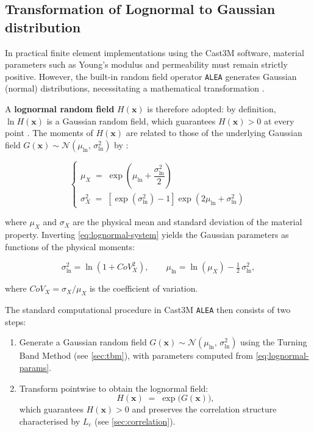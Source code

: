 \subsection{Transformation of Lognormal to Gaussian distribution} \label{sec:lognormal-transformation}

In practical finite element implementations using the Cast3M software, material parameters such as Young's modulus and permeability must remain strictly positive. However, the built-in random field operator \texttt{ALEA} generates Gaussian (normal) distributions, necessitating a mathematical transformation \cite{sudret2000}.

A \textbf{lognormal random field} $H(\mathbf{x})$ is therefore adopted: by definition, $\ln H(\mathbf{x})$ is a Gaussian random field, which guarantees $H(\mathbf{x}) > 0$ at every point \cite{delarrard2010}. The moments of $H(\mathbf{x})$ are related to those of the underlying Gaussian field $G(\mathbf{x}) \sim \mathcal{N}(\mu_{\ln},\,\sigma_{\ln}^2)$ by \cite{sudret2000}:

\begin{equation}
    \begin{cases}
        \mu_X \;=\; \exp\!\left(\mu_{\ln} + \dfrac{\sigma_{\ln}^2}{2}\right) \\[8pt]
        \sigma_X^2 \;=\; \left[\exp(\sigma_{\ln}^2) - 1\right]
                         \exp\!\left(2\mu_{\ln} + \sigma_{\ln}^2\right)
    \end{cases}
    \label{eq:lognormal-system}
\end{equation}

where $\mu_X$ and $\sigma_X$ are the physical mean and standard deviation of the material property. Inverting \cref{eq:lognormal-system} yields the Gaussian parameters as functions of the physical moments:

\begin{equation}
    \sigma_{\ln}^2 = \ln\!\left(1 + CoV_X^2\right),
    \qquad
    \mu_{\ln} = \ln(\mu_X) - \tfrac{1}{2}\,\sigma_{\ln}^2,
    \label{eq:lognormal-params}
\end{equation}

where $CoV_X = \sigma_X/\mu_X$ is the coefficient of variation.

The standard computational procedure in Cast3M \texttt{ALEA} then consists of two steps:

\begin{enumerate}
    \item Generate a Gaussian random field
          $G(\mathbf{x}) \sim \mathcal{N}(\mu_{\ln},\,\sigma_{\ln}^2)$ using the Turning Band Method (see \cref{sec:tbm}), with parameters computed from \cref{eq:lognormal-params}.

    \item Transform pointwise to obtain the lognormal field:
          \begin{equation}
              H(\mathbf{x}) \;=\;
              \exp\!\bigl(G(\mathbf{x})\bigr),
              \label{eq:lognormal-transform}
          \end{equation}
          which guarantees $H(\mathbf{x}) > 0$ and preserves the correlation structure characterised by $L_c$ (see \cref{sec:correlation}).
\end{enumerate}

